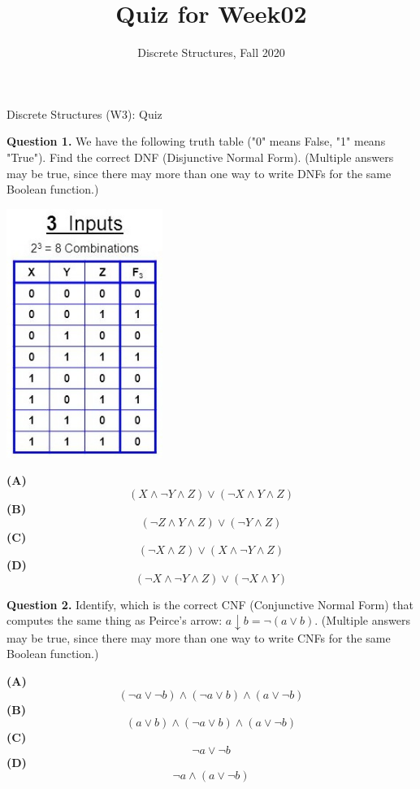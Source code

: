 \documentclass[jou]{apa6}
\title{Quiz for Week02}
\author{Discrete Structures, Fall 2020}
\affiliation{RBS}
\begin{document}

\twocolumn
{\Large Discrete Structures (W3): Quiz}

\thispagestyle{empty}

\vspace{6pt}
{\bf Question 1.} We have the following
truth table ("0" means False, "1" means "True"). 
Find the correct DNF (Disjunctive Normal Form). 
(Multiple answers may be true, since
there may more than one way to write DNFs for the same Boolean 
function.)


\begin{center}
\includegraphics[width=2in]{quiz3/table2.jpg}
\end{center}


{\large
\noindent
{\normalsize \bf (A)}
$$(X \wedge \neg Y \wedge Z) \vee (\neg X \wedge Y \wedge Z)$$
{\normalsize \bf (B)} %
$$(\neg Z \wedge Y \wedge Z) \vee (\neg Y \wedge Z)$$
{\normalsize \bf (C)} %
$$(\neg X \wedge Z) \vee (X \wedge \neg Y \wedge Z)$$
{\normalsize \bf (D)}
$$(\neg X \wedge \neg Y \wedge Z) \vee (\neg X \wedge Y)$$
}



{\bf Question 2.} Identify, which is the correct CNF (Conjunctive Normal Form) that computes the same thing as 
Peirce's arrow: $a \downarrow b = \neg (a \vee b)$.
(Multiple answers may be true, since
there may more than one way to write CNFs for the same Boolean 
function.)

{\large
\noindent
{\normalsize \bf (A)} %
$$(\neg a \vee \neg b) \wedge (\neg a \vee b) \wedge (a \vee \neg b)$$
{\normalsize \bf (B)}
$$(a \vee b) \wedge (\neg a \vee b) \wedge (a \vee \neg b)$$
{\normalsize \bf (C)}
$$\neg a \vee \neg b$$
{\normalsize \bf (D)} %
$$\neg a \wedge (a \vee \neg b)$$
}
\end{document}

